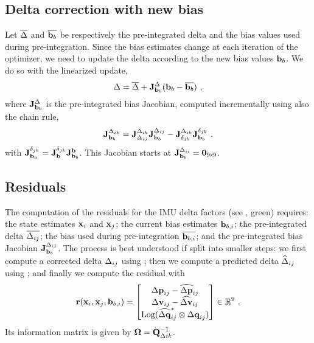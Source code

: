 \subsection{Delta correction with new bias}

Let $\overline{\Delta}$ and $\overline{{\bf b}_b}$ be respectively the pre-integrated delta and the bias values used during pre-integration. Since the bias estimates change at each iteration of the optimizer, we need to update the delta according to the new bias values ${\bf b}_b$. We do so with the linearized update,
%
\begin{align}\label{equ:delta_correction}
\Delta = \overline{\Delta} + {{\bf J}^{\Delta}_{{\bf b}_b}}({\bf b}_b - \overline{{\bf b}_b})
~,
\end{align}
%
where ${{\bf J}^{\Delta}_{{\bf b}_b}}$ is the pre-integrated bias Jacobian, computed incrementally using also the chain rule,
%
\begin{align}
{{\bf J}^{\Delta_{ik}}_{{\bf b}_b}} 
= {{\bf J}^{\Delta_{ik}}_{\Delta_{ij}}}{{\bf J}^{\Delta_{ij}}_{{\bf b}_b}} 
- {{\bf J}^{\Delta_{ik}}_{\delta_{jk}}}{{\bf J}^{\delta_{jk}}_{{\bf b}_b}}
~.
\end{align}
%
with 
$
{{\bf J}^{\delta_{jk}}_{{\bf b}_b}}={{\bf J}^{\delta_{jk}}_{{\bf b}}} {{\bf J}^{{\bf b}}_{{\bf b}_b}}
$.
%
This Jacobian starts at ${{\bf J}^{\Delta_{ii}}_{{\bf b}_b}} = {\bf0}_{9\!\times\! 9}$.


\subsection{Residuals}

The computation of the residuals for the IMU delta factors (see , green) requires: the state estimates ${\bf x}_i$ and ${\bf x}_j$; the current bias estimates ${\bf b}_{b,i}$; the pre-integrated delta $\overline{\Delta_{ij}}$; the bias used during pre-integration $\overline{{\bf b}_{b,i}}$; and the pre-integrated bias Jacobian ${{\bf J}^{\Delta_{ij}}_{{\bf b}_b}}$. The process is best understood if split into smaller steps: we first compute a corrected delta $\Delta_{ij}$ using ; then we compute a predicted delta $\widehat{\Delta}_{ij}$ using ; and finally we compute the residual with
%
\begin{align}\label{equ:imu_residual}
{\bf r}({\bf x}_i,{\bf x}_j,{\bf b}_{b,i}) 
= \begin{bmatrix}
{\Delta{\bf p}}_{ij}-\widehat{{\Delta{\bf p}}}_{ij} \\
{\Delta{\bf v}}_{ij}-\widehat{{\Delta{\bf v}}}_{ij} \\
\operatorname*{Log}(\widehat{{\Delta{\bf q}}}_{ij}^*\otimes{\Delta{\bf q}}_{ij})
\end{bmatrix} 
\in {\mathbb R}^9
~.
\end{align}
%
Its information matrix is given by ${\bm \Omega}={\bf Q}_{\Delta ik}^{-1}$.







